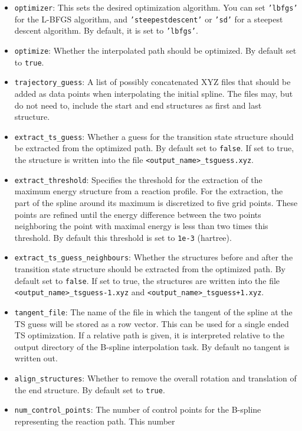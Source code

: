 \documentclass[]{tufte-book}
\begin{document}
\begin{itemize}
\item \texttt{optimizer}: This sets the desired optimization algorithm. You can set \texttt{'lbfgs'} for the L-BFGS algorithm, and
\texttt{'steepestdescent'} or \texttt{'sd'} for a steepest descent algorithm. By default, it is set to \texttt{'lbfgs'}.
\item \texttt{optimize}: Whether the interpolated path should be optimized. By default set to \texttt{true}.
\item \texttt{trajectory\_guess}: A list of possibly concatenated XYZ files that should be added as data points when interpolating
the initial spline. The files may, but do not need to, include the start and end structures as first and last structure.
\item \texttt{extract\_ts\_guess}:  Whether a guess for the transition state structure should be extracted from the optimized
path. By default set to \texttt{false}. If set to true, the structure is written into the file \texttt{<output\_name>\_tsguess.xyz}.
\item \texttt{extract\_threshold}: Specifies the threshold for the extraction of the maximum energy structure from a 
reaction profile. For the extraction, the part of the spline around its maximum is discretized to five grid points. These
points are refined until the energy difference between the two points neighboring the point with maximal energy is less 
than two times this threshold. By default this threshold is set to \texttt{1e-3} (hartree).
\item \texttt{extract\_ts\_guess\_neighbours}: Whether the structures before and after the transition state structure should be 
extracted from the optimized path. By default set to \texttt{false}. If set to true, the structures are written into the file 
\texttt{<output\_name>\_tsguess-1.xyz} and  \texttt{<output\_name>\_tsguess+1.xyz}.
\item \texttt{tangent\_file}: The name of the file in which the tangent of the spline at the TS guess will be stored as a row vector. 
This can be used for a single ended TS optimization. If a relative path is given, it is interpreted relative to the output directory 
of the B-spline interpolation task. By default no tangent is written out.
\item \texttt{align\_structures}: Whether to remove the overall rotation and translation of the end structure. By 
default set to \texttt{true}.
\item \texttt{num\_control\_points}: The number of control points for the B-spline representing the reaction path. This number 

\end{itemize}
\end{document}
